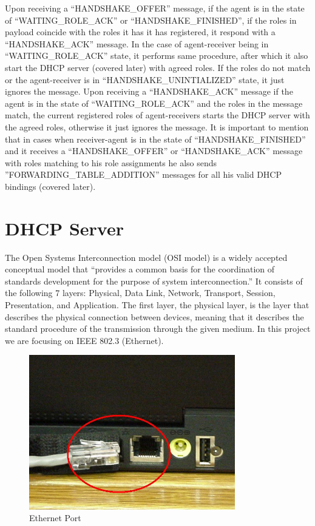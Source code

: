 Upon receiving a “HANDSHAKE\_OFFER” message, if the agent is in the state of “WAITING\_ROLE\_ACK” or “HANDSHAKE\_FINISHED”, if the roles in payload coincide with the roles it has it has registered, it respond with a “HANDSHAKE\_ACK” message. In the case of agent-receiver being in “WAITING\_ROLE\_ACK” state, it performs same procedure, after which it also start the DHCP server (covered later) with agreed roles. If the roles do not match or the agent-receiver is in “HANDSHAKE\_UNINTIALIZED” state, it just ignores the message.
Upon receiving a “HANDSHAKE\_ACK” message if the agent is in the state of “WAITING\_ROLE\_ACK” and the roles in the message match, the current registered roles of agent-receivers starts the DHCP server with the agreed roles, otherwise it just ignores the message. 
It is important to mention that in cases when receiver-agent is in the state of “HANDSHAKE\_FINISHED” and it receives a “HANDSHAKE\_OFFER” or “HANDSHAKE\_ACK” message with roles matching to his role assignments he also sends ”FORWARDING\_TABLE\_ADDITION” messages for all his valid DHCP bindings (covered later).

\section{DHCP Server}

The Open Systems Interconnection model (OSI model) is a widely accepted conceptual model that “provides a common basis for the coordination of standards development for the purpose of system interconnection.” \cite{OSI} It consists of the following 7 layers: Physical, Data Link, Network, Transport, Session, Presentation, and Application. The first layer, the physical layer, is the layer that describes the physical connection between devices, meaning that it describes the standard procedure of the transmission through the given medium. In this project we are focusing on IEEE 802.3 (Ethernet). 

\begin{figure}[htp]
\begin{center}
\includegraphics[width=0.8\textwidth]{ethernet-port}
\end{center}
\caption{Ethernet Port}
\label{ethernet-port}
\end{figure}

